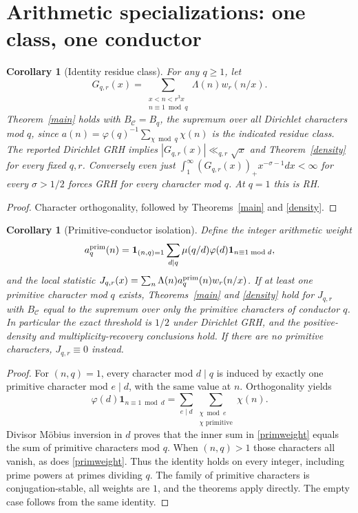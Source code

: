 \documentclass[11pt]{article}
\newtheorem{corollary}[theorem]{Corollary}
\theoremstyle{remark}\newtheorem{remark}[theorem]{Remark}
\newcommand{\ind}{\mathbf{1}}
\newcommand{\C}{\mathcal C}
\begin{document}
\section{Arithmetic specializations: one class, one conductor}
\begin{corollary}[Identity residue class]\label{class}
For any $q\ge1$, let
\[
 G_{q,r}(x)=\sum_{\substack{x<n<r^3x\\n\equiv1\bmod q}}\Lambda(n)w_r(n/x).
\]
Theorem~\ref{main} holds with $B_\C=B_q$, the supremum over all Dirichlet characters mod $q$, since $a(n)=\varphi(q)^{-1}\sum_{\chi\bmod q}\chi(n)$ is the indicated residue class. The reported Dirichlet GRH implies $|G_{q,r}(x)|\ll_{q,r}\sqrt x$ and Theorem~\ref{density} for every fixed $q,r$. Conversely even just $\int_1^\infty (G_{q,r}(x))_+x^{-\sigma-1}dx<\infty$ for every $\sigma>1/2$ forces GRH for every character mod $q$. At $q=1$ this is RH.
\end{corollary}
\begin{proof} Character orthogonality, followed by Theorems~\ref{main} and \ref{density}. \end{proof}

\begin{corollary}[Primitive-conductor isolation]\label{conductor}
Define the integer arithmetic weight
\begin{equation}\label{primweight}
 a_q^{\rm prim}(n)=\ind_{(n,q)=1}\sum_{d\mid q}\mu(q/d)\varphi(d)\ind_{n\equiv1\bmod d},
\end{equation}
and the local statistic $J_{q,r}(x)=\sum_n\Lambda(n)a_q^{\rm prim}(n)w_r(n/x)$. If at least one primitive character mod $q$ exists, Theorems~\ref{main} and \ref{density} hold for $J_{q,r}$ with $B_\C$ equal to the supremum over \emph{only} the primitive characters of conductor $q$. In particular the exact threshold is $1/2$ under Dirichlet GRH, and the positive-density and multiplicity-recovery conclusions hold. If there are no primitive characters, $J_{q,r}\equiv0$ instead.
\end{corollary}
\begin{proof}
For $(n,q)=1$, every character mod $d\mid q$ is induced by exactly one primitive character mod $e\mid d$, with the same value at $n$. Orthogonality yields
\[
 \varphi(d)\ind_{n\equiv1\bmod d}=\sum_{e\mid d}\sum_{\substack{\chi\bmod e\\\chi\text{ primitive}}}\chi(n).
\]
Divisor M\"obius inversion in $d$ proves that the inner sum in \eqref{primweight} equals the sum of primitive characters mod $q$. When $(n,q)>1$ those characters all vanish, as does \eqref{primweight}. Thus the identity holds on every integer, including prime powers at primes dividing $q$. The family of primitive characters is conjugation-stable, all weights are $1$, and the theorems apply directly. The empty case follows from the same identity.
\end{proof}
\end{document}
